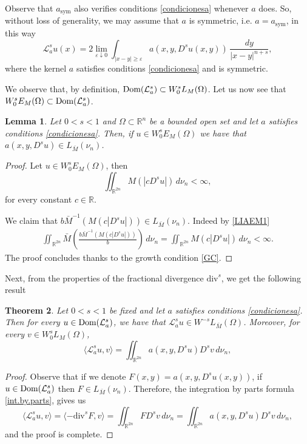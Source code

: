 \documentclass{amsart}
\def\Dom{\text{\normalfont Dom}}
\newcommand{\A}{\mathcal{L}_a^s}
\newcommand{\R}{{\mathbb R}}
\newtheorem{teo}{Theorem}[section]
\newtheorem{lema}[teo]{Lemma}
\theoremstyle{remark}
\theoremstyle{definition}
\numberwithin{equation}{section}
\begin{document}
Observe that $a_{\text{sym}}$ also verifies conditions \ref{condicionesa} whenever $a$ does. So, without loss of generality, we may assume that $a$ is symmetric, i.e. $a=a_{\text{sym}}$, in this way
\begin{equation}\label{operador}
\A u(x)=2\lim_{\varepsilon\downarrow 0}\int_{|x-y|\geq \varepsilon}a(x,y,D^su(x,y))\,\frac{dy}{|x-y|^{n+s}},	
\end{equation}
where the kernel $a$ satisfies conditions \ref{condicionesa} and is symmetric.

We observe that, by definition, $\Dom(\A)\subset W_0^sL_M(\Omega)$. Let us now see that $W_0^sE_M(\Omega)\subset \Dom(\A)$.
\begin{lema}\label{WSEINDOM}
Let $0<s<1$ and $\Omega\subset \R^n$ be a bounded open set and let $a$ satisfies conditions \ref{condicionesa}. Then, if $u\in W_0^sE_M(\Omega)$ we have that $a(x,y,D^su)\in L_{\bar{M}}(\nu_n)$.
\end{lema}

\begin{proof}
Let $u\in W_0^sE_M(\Omega)$, then 
\begin{equation}\label{LIAEM1}
\iint_{\R^{2n}}M\left (|cD^s u| \right )\,d\nu_n<\infty,
\end{equation}	
for every constant $c\in\R$.

We claim that $b \bar{M}^{-1}(M(c|D^s u|))\in L_{\bar{M}}(\nu_n)$. Indeed by \eqref{LIAEM1}
\begin{align*}
\iint_{\R^{2n}}\bar{M}\left (\frac{b \bar{M}^{-1}(M(c|D^s u|))}{b} \right )\,d\nu_n =\iint_{\R^{2n}} M(c|D^su|)\,d\nu_n<\infty.
\end{align*}
The proof concludes thanks to the growth condition \eqref{GC}.
\end{proof}

Next, from the properties of the fractional divergence $\text{div}^s$, we get the following result
\begin{teo}
Let $0<s<1$ be fixed and let $a$ satisfies conditions \ref{condicionesa}. Then for every $u\in \Dom(\A)$, we have that $\A u\in W^{-s}L_{\bar{M}}(\Omega)$. Moreover, for every $v\in W_0^s L_{M}(\Omega)$,
\[
\langle \A u,v \rangle =\iint_{\R^{2n}}a(x,y,D^su)D^sv\,d\nu_n,
\]
\end{teo}

\begin{proof}
Observe that if we denote $F(x,y) = a(x, y, D^s u(x, y))$, if $u\in \Dom(\A)$ then $F\in L_{\bar M}(\nu_n)$. Therefore, the integration by parts formula \eqref{int.by.parts}, gives us
$$
\langle \A u,v \rangle = \langle-\text{div}^s F, v\rangle = \iint_{\R^{2n}} FD^sv\, d\nu_n = \iint_{\R^{2n}}a(x,y,D^su)D^sv\,d\nu_n,
$$
and the proof is complete.
\end{proof}
\end{document}
